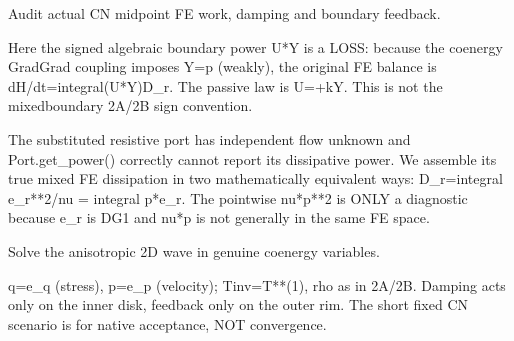 \documentclass[letterpaper,10pt,english]{sphinxmanual}
\begin{document}
\begin{fulllineitems}

\pysigstartsignatures
\pysiglinewithargsret
{}
{}
{}
\pysigstopsignatures
\sphinxAtStartPar
Audit actual CN midpoint FE work, damping and boundary feedback.

\sphinxAtStartPar
Here the signed algebraic boundary power U*Y is a LOSS: because
the coenergy Grad\sphinxhyphen{}Grad coupling imposes Y=\sphinxhyphen{}p (weakly), the original
FE balance is dH/dt=\sphinxhyphen{}integral(U*Y)\sphinxhyphen{}D\_r. The passive law is U=+kY.
This is not the mixed\sphinxhyphen{}boundary 2A/2B sign convention.

\sphinxAtStartPar
The substituted resistive port has  independent flow unknown and
Port.get\_power() correctly cannot report its dissipative power.
We assemble its true mixed FE dissipation in two mathematically
equivalent ways: D\_r=integral e\_r**2/nu = \sphinxhyphen{}integral p*e\_r.
The pointwise nu*p**2 is ONLY a diagnostic because e\_r is DG1 and
nu*p is not generally in the same FE space.

\end{fulllineitems}



\begin{fulllineitems}

\pysigstartsignatures
\pysiglinewithargsret
{}
{\sphinxparamcomma {}\sphinxparamcomma {}\sphinxparamcomma {}\sphinxparamcomma {}}
{}
\pysigstopsignatures
\sphinxAtStartPar
Solve the anisotropic 2D wave in genuine co\sphinxhyphen{}energy variables.

\sphinxAtStartPar
q=e\_q (stress), p=e\_p (velocity); Tinv=T**(\sphinxhyphen{}1), rho as in 2A/2B.
Damping acts only on the inner disk, feedback only on the outer rim.
The short fixed CN scenario is for native acceptance, NOT convergence.

\end{fulllineitems}
\end{document}

